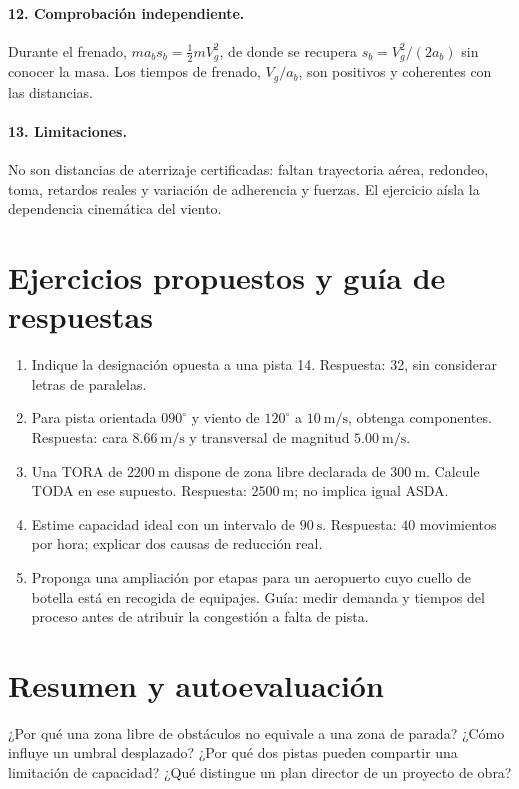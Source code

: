 \paragraph{12. Comprobación independiente.} Durante el frenado, $ma_bs_b=\tfrac12mV_g^2$, de donde se recupera $s_b=V_g^2/(2a_b)$ sin conocer la masa. Los tiempos de frenado, $V_g/a_b$, son positivos y coherentes con las distancias.
\paragraph{13. Limitaciones.} No son distancias de aterrizaje certificadas: faltan trayectoria aérea, redondeo, toma, retardos reales y variación de adherencia y fuerzas. El ejercicio aísla la dependencia cinemática del viento.

\section{Ejercicios propuestos y guía de respuestas}
\begin{enumerate}
\item Indique la designación opuesta a una pista 14. Respuesta: 32, sin considerar letras de paralelas.
\item Para pista orientada $090^\circ$ y viento de $120^\circ$ a $10\ \mathrm{m/s}$, obtenga componentes. Respuesta: cara $8.66\ \mathrm{m/s}$ y transversal de magnitud $5.00\ \mathrm{m/s}$.
\item Una TORA de $2200\ \mathrm m$ dispone de zona libre declarada de $300\ \mathrm m$. Calcule TODA en ese supuesto. Respuesta: $2500\ \mathrm m$; no implica igual ASDA.
\item Estime capacidad ideal con un intervalo de $90\ \mathrm s$. Respuesta: $40$ movimientos por hora; explicar dos causas de reducción real.
\item Proponga una ampliación por etapas para un aeropuerto cuyo cuello de botella está en recogida de equipajes. Guía: medir demanda y tiempos del proceso antes de atribuir la congestión a falta de pista.
\end{enumerate}
\section{Resumen y autoevaluación}
¿Por qué una zona libre de obstáculos no equivale a una zona de parada? ¿Cómo influye un umbral desplazado? ¿Por qué dos pistas pueden compartir una limitación de capacidad? ¿Qué distingue un plan director de un proyecto de obra?
